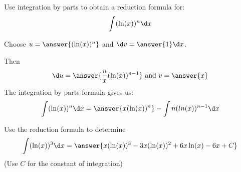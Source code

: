 \documentclass{ximera}
\author{Jason Miller}
\begin{document}
\begin{exercise}

Use integration by parts to obtain a reduction formula for:
\[
\int (\ln(x))^{n} \d x
\]


Choose $u=\answer{( \ln(x) )^{n} }$ and $\d v=\answer{1} \d x$.

Then
\[ \d u=\answer{\frac{n}{x}( \ln(x) )^{n-1}} \textrm{  and  } v=\answer{x}
\]
The integration by parts formula gives us:
\[
\int ( \ln(x) )^{n} \d x=\answer{x (\ln(x))^{n}} -  \int n (ln(x))^{n-1} \d x
\]

Use the reduction formula to determine 
\[
\int ( \ln(x))^{3} \d x=\answer{x(\ln(x))^{3} -3x (\ln(x))^{2} + 6x \ln(x) -6x +C }
\]
(Use $C$ for the constant of integration)

\end{exercise}
\end{document}
